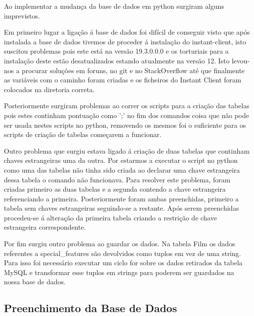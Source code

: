 \par Ao implementar a mudança da base de dados em python surgiram alguns imprevistos.
\par Em primeiro lugar a ligação á base de dados foi difícil de conseguir visto que após instalada a base de dados tivemos de proceder á instalação do instant-client, isto suscitou problemas pois este está na versão 19.3.0.0.0 e os torturiais para a instalação deste estão desatualizados estando atualmente na versão 12. Isto levou-nos a procurar soluções em foruns, no git e no StackOverflow até que finalmente as variáveis com o caminho foram criadas e os ficheiros do Instant Client foram colocados na diretoria correta.\newline
\par Posteriormente surgiram problemas ao correr os scripts para a criação das tabelas pois estes continham pontuação como ';' no fim dos comandos coisa que não pode ser usada nestes scripts no python, removendo os mesmos foi o suficiente para os scripts de criação de tabelas começarem a funcionar.\newline
\par Outro problema que surgiu estava ligado á criação de duas tabelas que continham chaves estrangeiras uma da outra. Por estarmos a executar o script no python como uma das tabelas não tinha sido criada ao declarar uma chave estrangeira dessa tabela o comando não funcionava. Para resolver este problema, foram criadas primeiro as duas tabelas e a segunda contendo a chave estrangeira referenciando a primeira. Posteriormente foram ambas preenchidas, primeiro a tabela sem chaves estrangeiras seguindo-se a restante. Após serem preenchidas procedeu-se á alteração da primeira tabela criando a restrição de chave estrangeira correspondente.\newline
\par Por fim surgiu outro problema ao guardar os dados. Na tabela Film os dados referentes a special\_features são devolvidos como tuplos em vez de uma string. Para isso foi necessário executar um ciclo for sobre os dados retirados da tabela MySQL e transformar esse tuplos em strings para poderem ser guardados na nossa base de dados.\newline  


\subsection{Preenchimento da Base de Dados}

